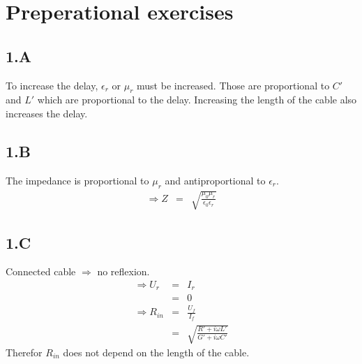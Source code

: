 \section{Preperational exercises}
\subsection{1.A}
To increase the delay, $\epsilon_r$ or $\mu_r$ must be increased.
Those are proportional to $C'$ and $L'$ which are proportional to the delay.
Increasing the length of the cable also increases the delay.
\subsection{1.B}
The impedance is proportional to $\mu_r$ and antiproportional to $\epsilon_r$.
\begin{eqnarray*}
	\Rightarrow Z&=&\sqrt{\frac{\mu_0\mu_r}{\epsilon_0\epsilon_r}}
\end{eqnarray*}
\subsection{1.C}
Connected cable $\Rightarrow$ no reflexion.
\begin{eqnarray*}
	\Rightarrow U_r&=&I_r\\
	&=&0\\
	\Rightarrow R_{in}&=&\frac{U_f}{I_f}\\
	&=&\sqrt{\frac{R'+i\omega L'}{G'+i\omega C'}}
\end{eqnarray*}
Therefor $R_{in}$ does not depend on the length of the cable.